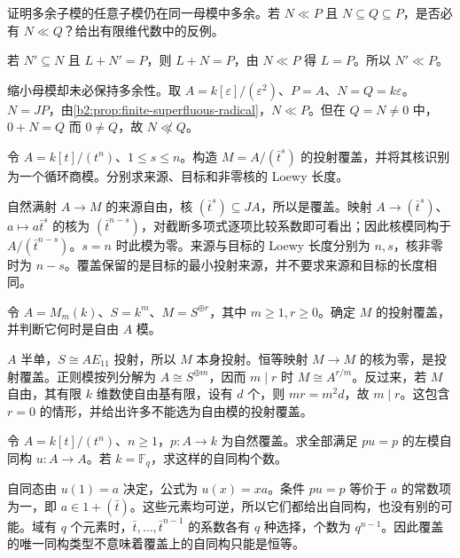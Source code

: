 \begin{exercise}\label{b2:ex:15-superfluous-ambient}
	证明多余子模的任意子模仍在同一母模中多余。若 \(N\ll P\) 且 \(N\subseteq Q\subseteq P\)，是否必有 \(N\ll Q\)？给出有限维代数中的反例。
\end{exercise}
\begin{solution}
	若 \(N'\subseteq N\) 且 \(L+N'=P\)，则 \(L+N=P\)，由 \(N\ll P\) 得 \(L=P\)。所以 \(N'\ll P\)。

	缩小母模却未必保持多余性。取 \(A=k[\varepsilon]/(\varepsilon^2)\)、\(P=A\)、\(N=Q=k\varepsilon\)。\(N=JP\)，由\cref{b2:prop:finite-superfluous-radical}，\(N\ll P\)。但在 \(Q=N\ne0\) 中，\(0+N=Q\) 而 \(0\ne Q\)，故 \(N\not\ll Q\)。
\end{solution}

\begin{exercise}\label{b2:ex:15-truncated-projective-cover}
	令 \(A=k[t]/(t^n)\)、\(1\le s\le n\)。构造 \(M=A/(\bar t^s)\) 的投射覆盖，并将其核识别为一个循环商模。分别求来源、目标和非零核的 Loewy 长度。
\end{exercise}
\begin{solution}
	自然满射 \(A\to M\) 的来源自由，核 \((\bar t^s)\subseteq JA\)，所以是覆盖。映射 \(A\to(\bar t^s)\)、\(a\mapsto a\bar t^s\) 的核为 \((\bar t^{n-s})\)，对截断多项式逐项比较系数即可看出；因此核模同构于 \(A/(\bar t^{n-s})\)。\(s=n\) 时此模为零。来源与目标的 Loewy 长度分别为 \(n,s\)，核非零时为 \(n-s\)。覆盖保留的是目标的最小投射来源，并不要求来源和目标的长度相同。
\end{solution}

\begin{exercise}\label{b2:ex:15-matrix-algebra-covers}
	令 \(A=M_m(k)\)、\(S=k^m\)、\(M=S^{\oplus r}\)，其中 \(m\ge1,r\ge0\)。确定 \(M\) 的投射覆盖，并判断它何时是自由 \(A\) 模。
\end{exercise}
\begin{solution}
	\(A\) 半单，\(S\cong AE_{11}\) 投射，所以 \(M\) 本身投射。恒等映射 \(M\to M\) 的核为零，是投射覆盖。正则模按列分解为 \(A\cong S^{\oplus m}\)，因而 \(m\mid r\) 时 \(M\cong A^{r/m}\)。反过来，若 \(M\) 自由，其有限 \(k\) 维数使自由基有限，设有 \(d\) 个，则 \(mr=m^2d\)，故 \(m\mid r\)。这包含 \(r=0\) 的情形，并给出许多不能选为自由模的投射覆盖。
\end{solution}

\begin{exercise}\label{b2:ex:15-cover-automorphisms}
	令 \(A=k[t]/(t^n)\)、\(n\ge1\)，\(p:A\to k\) 为自然覆盖。求全部满足 \(pu=p\) 的左模自同构 \(u:A\to A\)。若 \(k=\mathbb F_q\)，求这样的自同构个数。
\end{exercise}
\begin{solution}
	自同态由 \(u(1)=a\) 决定，公式为 \(u(x)=xa\)。条件 \(pu=p\) 等价于 \(a\) 的常数项为一，即 \(a\in1+(\bar t)\)。这些元素均可逆，所以它们都给出自同构，也没有别的可能。域有 \(q\) 个元素时，\(\bar t,\ldots,\bar t^{n-1}\) 的系数各有 \(q\) 种选择，个数为 \(q^{n-1}\)。因此覆盖的唯一同构类型不意味着覆盖上的自同构只能是恒等。
\end{solution}

